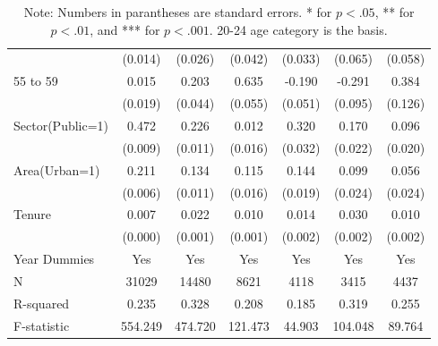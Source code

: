 \documentclass[12pt,author-year]{article}
\begin{document}
\begin{table}[H]
{{\begin{tabular}{l*{6}{c}}
&  (0.014)         &  (0.026)         &  (0.042)         &  (0.033)         &  (0.065)         &  (0.058)         \\
55 to 59            &    0.015         &    0.203\sym{***}&    0.635\sym{***}&   -0.190\sym{***}&   -0.291\sym{**} &    0.384\sym{**} \\
&  (0.019)         &  (0.044)         &  (0.055)         &  (0.051)         &  (0.095)         &  (0.126)         \\
				Sector(Public=1)     &    0.472\sym{***}&    0.226\sym{***}&    0.012         &    0.320\sym{***}&    0.170\sym{***}&    0.096\sym{***}\\
				&  (0.009)         &  (0.011)         &  (0.016)         &  (0.032)         &  (0.022)         &  (0.020)         \\
				Area(Urban=1)      &    0.211\sym{***}&    0.134\sym{***}&    0.115\sym{***}&    0.144\sym{***}&    0.099\sym{***}&    0.056\sym{*}  \\
				&  (0.006)         &  (0.011)         &  (0.016)         &  (0.019)         &  (0.024)         &  (0.024)         \\
				Tenure            &    0.007\sym{***}&    0.022\sym{***}&    0.010\sym{***}&    0.014\sym{***}&    0.030\sym{***}&    0.010\sym{***}\\
				&  (0.000)         &  (0.001)         &  (0.001)         &  (0.002)         &  (0.002)         &  (0.002)         \\
				\midrule
Year Dummies        &      Yes         &      Yes         &      Yes         &      Yes         &      Yes         &      Yes         \\
N                   &  31029        &  14480         & 8621        & 4118         & 3415         & 4437        \\
R-squared                &    0.235         &    0.328         &    0.208         &    0.185         &    0.319         &    0.255         \\
F-statistic           &  554.249         &  474.720         &  121.473         &   44.903         &  104.048         &   89.764         \\
				\bottomrule
	\end{tabular}}}
	\caption*{{\scriptsize Note: Numbers in parantheses are standard errors. * for $p<.05$, ** for $p<.01$, and *** for $p<.001$. 20-24 age category is the basis.}}
\end{table}
\vspace{-5pt}
\end{document}
